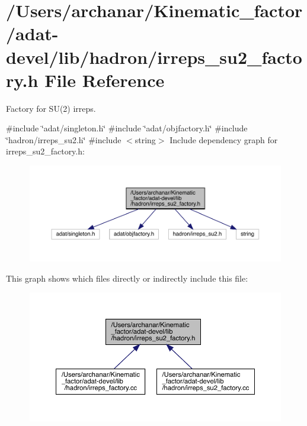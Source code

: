 \hypertarget{adat-devel_2lib_2hadron_2irreps__su2__factory_8h}{}\section{/\+Users/archanar/\+Kinematic\+\_\+factor/adat-\/devel/lib/hadron/irreps\+\_\+su2\+\_\+factory.h File Reference}
\label{adat-devel_2lib_2hadron_2irreps__su2__factory_8h}


Factory for S\+U(2) irreps.  


{\ttfamily \#include \char`\"{}adat/singleton.\+h\char`\"{}}\newline
{\ttfamily \#include \char`\"{}adat/objfactory.\+h\char`\"{}}\newline
{\ttfamily \#include \char`\"{}hadron/irreps\+\_\+su2.\+h\char`\"{}}\newline
{\ttfamily \#include $<$string$>$}\newline
Include dependency graph for irreps\+\_\+su2\+\_\+factory.\+h\+:
\nopagebreak
\begin{figure}[H]
\begin{center}
\leavevmode
\includegraphics[width=350pt]{d1/d67/adat-devel_2lib_2hadron_2irreps__su2__factory_8h__incl}
\end{center}
\end{figure}
This graph shows which files directly or indirectly include this file\+:
\nopagebreak
\begin{figure}[H]
\begin{center}
\leavevmode
\includegraphics[width=350pt]{d5/d1f/adat-devel_2lib_2hadron_2irreps__su2__factory_8h__dep__incl}
\end{center}
\end{figure}

